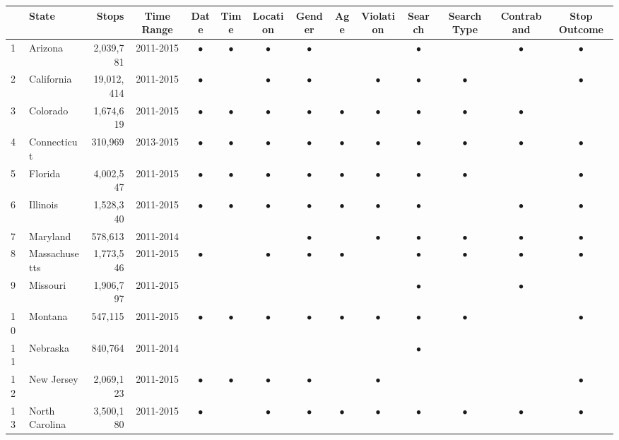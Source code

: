 \begin{table}[ht]
\centering
\begin{tabular}{llrccccccccccc}
  \hline
 & State & Stops & Time Range & Date & Time & Location & Gender & Age & Violation & Search & Search Type & Contraband & Stop Outcome \\ 
  \hline
1 & Arizona &  2,039,781 & 2011-2015 & $\bullet$ & $\bullet$ & $\bullet$ & $\bullet$ &  &  & $\bullet$ &  & $\bullet$ & $\bullet$ \\ 
  2 & California & 19,012,414 & 2011-2015 & $\bullet$ &  & $\bullet$ & $\bullet$ &  & $\bullet$ & $\bullet$ & $\bullet$ &  & $\bullet$ \\ 
  3 & Colorado &  1,674,619 & 2011-2015 & $\bullet$ & $\bullet$ & $\bullet$ & $\bullet$ & $\bullet$ & $\bullet$ & $\bullet$ & $\bullet$ & $\bullet$ &  \\ 
  4 & Connecticut &    310,969 & 2013-2015 & $\bullet$ & $\bullet$ & $\bullet$ & $\bullet$ & $\bullet$ & $\bullet$ & $\bullet$ & $\bullet$ & $\bullet$ & $\bullet$ \\ 
  5 & Florida &  4,002,547 & 2011-2015 & $\bullet$ & $\bullet$ & $\bullet$ & $\bullet$ & $\bullet$ & $\bullet$ & $\bullet$ & $\bullet$ &  & $\bullet$ \\ 
  6 & Illinois &  1,528,340 & 2011-2015 & $\bullet$ & $\bullet$ & $\bullet$ & $\bullet$ & $\bullet$ & $\bullet$ & $\bullet$ &  & $\bullet$ & $\bullet$ \\ 
  7 & Maryland &    578,613 & 2011-2014 &  &  &  & $\bullet$ &  & $\bullet$ & $\bullet$ & $\bullet$ & $\bullet$ & $\bullet$ \\ 
  8 & Massachusetts &  1,773,546 & 2011-2015 & $\bullet$ &  & $\bullet$ & $\bullet$ & $\bullet$ &  & $\bullet$ & $\bullet$ & $\bullet$ & $\bullet$ \\ 
  9 & Missouri &  1,906,797 & 2011-2015 &  &  &  &  &  &  & $\bullet$ &  & $\bullet$ &  \\ 
  10 & Montana &    547,115 & 2011-2015 & $\bullet$ & $\bullet$ & $\bullet$ & $\bullet$ & $\bullet$ & $\bullet$ & $\bullet$ & $\bullet$ &  & $\bullet$ \\ 
  11 & Nebraska &    840,764 & 2011-2014 &  &  &  &  &  &  & $\bullet$ &  &  &  \\ 
  12 & New Jersey &  2,069,123 & 2011-2015 & $\bullet$ & $\bullet$ & $\bullet$ & $\bullet$ &  & $\bullet$ &  &  &  & $\bullet$ \\ 
  13 & North Carolina &  3,500,180 & 2011-2015 & $\bullet$ &  & $\bullet$ & $\bullet$ & $\bullet$ & $\bullet$ & $\bullet$ & $\bullet$ & $\bullet$ & $\bullet$ \\ 

\end{tabular}
\end{table}
